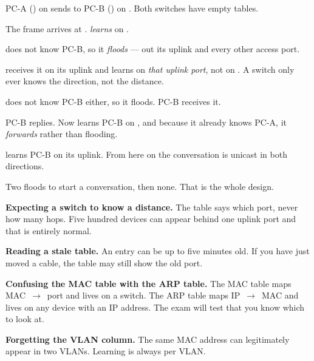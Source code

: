 \begin{worked}
PC-A () on  sends to PC-B
() on . Both switches have empty tables.

\begin{tightnum}
  \item The frame arrives at .  \emph{learns}
         on .
  \item {} does not know PC-B, so it \emph{floods} --- out its uplink and
        every other access port.
  \item {} receives it on its uplink and learns  on
        \emph{that uplink port}, not on . A switch only ever knows the
        direction, not the distance.
  \item {} does not know PC-B either, so it floods. PC-B receives it.
  \item PC-B replies. Now  learns PC-B on , and because it
        already knows PC-A, it \emph{forwards} rather than flooding.
  \item {} learns PC-B on its uplink. From here on the conversation is
        unicast in both directions.
\end{tightnum}
Two floods to start a conversation, then none. That is the whole design.
\end{worked}

\begin{pitfall}
\begin{tight}
  \item \textbf{Expecting a switch to know a distance.} The table says which
        port, never how many hops. Five hundred devices can appear behind one
        uplink port and that is entirely normal.
  \item \textbf{Reading a stale table.} An entry can be up to five minutes old.
        If you have just moved a cable, the table may still show the old port.
  \item \textbf{Confusing the MAC table with the ARP table.} The MAC table maps
        MAC~$\rightarrow$~port and lives on a switch. The ARP table maps
        IP~$\rightarrow$~MAC and lives on any device with an IP address. The exam
        will test that you know which to look at.
  \item \textbf{Forgetting the VLAN column.} The same MAC address can legitimately
        appear in two VLANs. Learning is always per VLAN.
\end{tight}
\end{pitfall}

